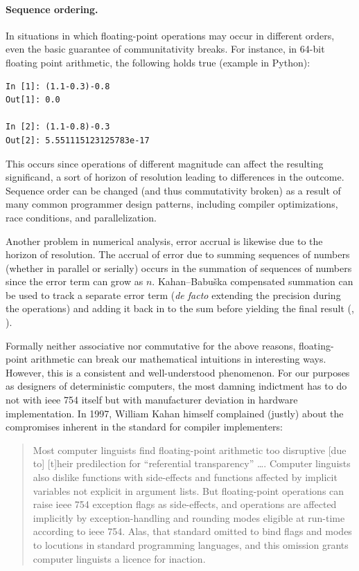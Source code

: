 \documentclass[twoside]{article}
\begin{document}
\paragraph{Sequence ordering.}

In situations in which floating-point operations may occur in different orders, even the basic guarantee of communitativity breaks.  For instance, in 64-bit floating point arithmetic, the following holds true (example in Python):

\lstset{language=Python}
\begin{lstlisting}[style=listingcode_python]
In [1]: (1.1-0.3)-0.8
Out[1]: 0.0

In [2]: (1.1-0.8)-0.3
Out[2]: 5.551115123125783e-17
\end{lstlisting}

\noindent
This occurs since operations of different magnitude can affect the resulting significand, a sort of horizon of resolution leading to differences in the outcome.  Sequence order can be changed (and thus commutativity broken) as a result of many common programmer design patterns, including compiler optimizations, race conditions, and parallelization.

Another problem in numerical analysis, error accrual is likewise due to the horizon of resolution.  The accrual of error due to summing sequences of numbers (whether in parallel or serially) occurs in the summation of sequences of numbers since the error term can grow as $n$.  Kahan–Babuška compensated summation can be used to track a separate error term (\emph{de facto} extending the precision during the operations) and adding it back in to the sum before yielding the final result (\citet{Kahan1965}, \citet{Babuska1969}).

Formally neither associative nor commutative for the above reasons, floating-point arithmetic can break our mathematical intuitions in interesting ways.  However, this is a consistent and well-understood phenomenon.  For our purposes as designers of deterministic computers, the most damning indictment has to do not with {\sc ieee} 754 itself but with manufacturer deviation in hardware implementation.  In 1997, William Kahan himself complained (justly) about the compromises inherent in the standard for compiler implementers:

\begin{quote}
Most computer linguists find floating-point arithmetic too disruptive [due to] [t]heir predilection for “referential transparency” ….  Computer linguists also dislike functions with side-effects and functions affected by implicit variables not explicit in argument lists. But floating-point operations can raise {\sc ieee} 754 exception flags as side-effects, and operations are affected implicitly by exception-handling and rounding modes eligible at run-time according to {\sc ieee} 754. Alas, that standard omitted to bind flags and modes to locutions in standard programming languages, and this omission grants computer linguists a licence for inaction.  \citep{Kahan1997}
\end{quote}
\end{document}
